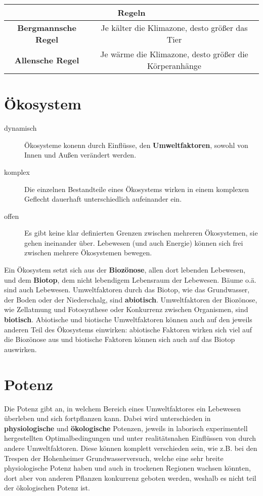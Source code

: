 \documentclass{article}
\begin{document}
\begin{center}
\begin{tabular}{ |c|c| } 
\hline
 \multicolumn{2}{|c|}{\textbf{Regeln}} \\ 
\hline
 \textbf{Bergmannsche Regel} & Je kälter die Klimazone, desto größer das Tier \\
\hline
 \textbf{Allensche Regel} & Je wärme die Klimazone, desto größer die Körperanhänge \\
\hline
\end{tabular}
\end{center}
 
 
\section{Ökosystem}  
\begin{description} 
\item[dynamisch] Ökosysteme konenn durch Einflüsse, den \textbf{Umweltfaktoren}, sowohl von Innen und Außen verändert werden. 
\item[komplex] Die einzelnen Bestandteile eines Ökosystems wirken in einem komplexen Geflecht dauerhaft unterschiedlich aufeinander ein.
\item[offen] Es gibt keine klar definierten Grenzen zwischen mehreren Ökosystemen, sie gehen ineinander über. Lebewesen (und auch Energie) können sich frei zwischen mehrere Ökosystemen bewegen.
\end{description} 
 
\noindent Ein Ökosystem setzt sich aus der \textbf{Biozönose}, allen dort lebenden Lebewesen, und dem \textbf{Biotop}, dem nicht lebendigem Lebensraum der Lebewesen. Bäume o.ä. sind auch Lebewesen. \newline
Umweltfaktoren durch das Biotop, wie das Grundwasser, der Boden oder der Niederschalg, sind \textbf{abiotisch}. Umweltfaktoren der Biozönose, wie Zellatmung und Fotosynthese oder Konkurrenz zwischen Organismen, sind \textbf{biotisch}. Abiotische und biotische Umweltfaktoren können auch auf den jeweils anderen Teil des Ökosystems einwirken: abiotische Faktoren wirken sich viel auf die Biozönose aus und biotische Faktoren können sich auch auf das Biotop auswirken.
 
\section{Potenz} 
Die Potenz gibt an, in welchem Bereich eines Umweltfaktores ein Lebewesen überleben und sich fortpflanzen kann. Dabei wird unterschieden in \textbf{physiologische} und \textbf{ökologische} Potenzen, jeweils in laborisch experimentell hergestellten Optimalbedingungen und unter realitätsnahen Einflüssen von durch andere Umweltfaktoren. \newline
Diese können komplett verschieden sein, wie z.B. bei den Trespen der Hohenheimer Grundwasserversuch, welche eine sehr breite physiologische Potenz haben und auch in trockenen Regionen wachsen könnten, dort aber von anderen Pflanzen konkurrenz geboten werden, weshalb es nicht teil der ökologischen Potenz ist.
 
\end{document}
